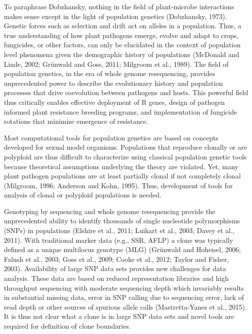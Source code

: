\documentclass{frontiersSCNS} %
\begin{document}
To paraphrase Dobzhansky, nothing in the field of plant-microbe
interactions makes sense except in the light of population genetics
(Dobzhansky, 1973). Genetic forces such as selection and drift act on
alleles in a population. Thus, a true understanding of how plant
pathogens emerge, evolve and adapt to crops, fungicides, or other
factors, can only be elucidated in the context of population level
phenomena given the demographic history of populations (McDonald and
Linde, 2002; Grünwald and Goss, 2011; Milgroom et al., 1989). The field
of population genetics, in the era of whole genome resequencing,
provides unprecedented power to describe the evolutionary history and
population processes that drive coevolution between pathogens and hosts.
This powerful field thus critically enables effective deployment of R
genes, design of pathogen informed plant resistance breeding programs,
and implementation of fungicide rotations that minimize emergence of
resistance.

Most computational tools for population genetics are based on concepts
developed for sexual model organisms. Populations that reproduce
clonally or are polyploid are thus difficult to characterize using
classical population genetic tools because theoretical assumptions
underlying the theory are violated. Yet, many plant pathogen populations
are at least partially clonal if not completely clonal (Milgroom, 1996;
Anderson and Kohn, 1995). Thus, development of tools for analysis of
clonal or polyploid populations is needed.

Genotyping by sequencing and whole genome resequencing provide the
unprecedented ability to identify thousands of single nucleotide
polymorphisms (SNPs) in populations (Elshire et al., 2011; Luikart et
al., 2003; Davey et al., 2011). With traditional marker data (e.g., SSR,
AFLP) a clone was typically defined as a unique multilocus genotype
(MLG) (Gr{ü}nwald and Hoheisel, 2006; Falush et al., 2003; Goss et al.,
2009; Cooke et al., 2012; Taylor and Fisher, 2003). Availability of
large SNP data sets provides new challenges for data analysis. These
data are based on reduced representation libraries and high throughput
sequencing with moderate sequencing depth which invariably results in
substantial missing data, error in SNP calling due to sequencing error,
lack of read depth or other sources of spurious allele calls
(Mastretta-Yanes et al., 2015). It is thus not clear what a clone is in
large SNP data sets and novel tools are required for definition of clone
boundaries.
\end{document}
